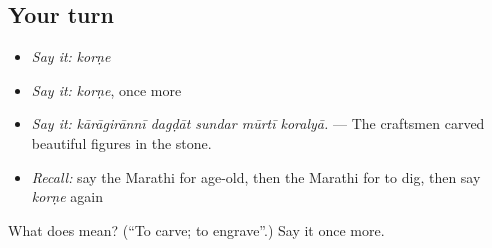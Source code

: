 \subsection*{Your turn}
\begin{itemize}
\raggedright
  \item \emph{Say it:} \emph{korṇe}
  \item \emph{Say it:} \emph{korṇe}, once more
  \item \emph{Say it:} \emph{kārāgirānnī dagḍāt sundar mūrtī koralyā.} — The craftsmen carved beautiful figures in the stone.
  \item \emph{Recall:} say the Marathi for age-old, then the Marathi for to dig, then say \emph{korṇe} again
\end{itemize}

\begin{tcolorbox}[breakable,colback=teal!4,colframe=teal!35!black,title={Before you move on}]
What does  mean? (\textquotedblleft{}To carve; to engrave\textquotedblright{}.) Say it once more.
\end{tcolorbox}
